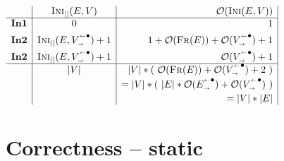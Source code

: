 \documentclass[leqno]{article}
\newcommand{\func}[1]{\mbox{\sc #1}}
\newcommand{\f}[1]{\func{#1}}
\newcommand{\srt}[1]{{\cal #1}}
\newcommand{\ret}{\mbox{$\ \rightarrow\ $}}
\newcommand{\sz}[1]{|#1|} %
\begin{document}
\hfill{%
$\begin{array}{r|c|r|}
 & \f{Ini}_{\sz{}}(E,V) & \cp(\f{Ini}(E,V)) \\ \hline
{\bf In1} & 0 & 1 \\[1ex]
{\bf In2} &  \f{Ini}_{\sz{}}(E,\rem V{})+1  & 1+\cp(\f{Fr}(E))+\cp(\rem V{})+1  \\[1ex]
{\bf In2} &  \f{Ini}_{\sz{}}(E,\rem V{})+1  &   \cp(\rem V{})+1  \\ \hline
 & \sz V & \sz V *(\ \cp(\f{Fr}(E))+\cp(\rem V{}) + 2\ ) \\[.5ex]
& & = \sz V *(\ \sz E *\cp(\rem E{}) +\cp(\rem V{}) \ )  \\[.5ex]
& & = \sz V * \sz E
\end{array}
$ }  \\[1ex]

\newpage
\section{Correctness -- static}
\end{document}
